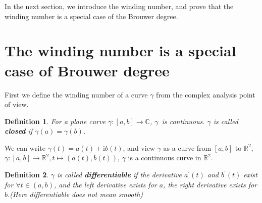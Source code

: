 \documentclass[11pt]{article}
\newtheorem{definition}{Definition}
\numberwithin{equation}{section} \numberwithin{theorem}{section}
\numberwithin{lemma}{section} \numberwithin{remark}{section}
\numberwithin{table}{section} \numberwithin{corollary}{section}
\numberwithin{example}{section} \numberwithin{conjecture}{section}
\numberwithin{assumption}{section}
\numberwithin{definition}{section}
\numberwithin{proposition}{section}
\begin{document}
 In the next section, we introduce the winding number, and  prove that the winding number is a special case of the Brouwer degree.

\section{The winding number is a special case of Brouwer degree}
First we define the winding number of a curve $\gamma$ from the complex analysis point of view.
\begin{definition}
For a plane curve $\gamma :[a,b]\rightarrow \mathbb{C}$,  $\gamma $\ is continuous. $ \gamma$ is called \textbf{closed }if $\gamma(a)=\gamma(b)$.
\end{definition}
We can write $\gamma(t) = a(t) +\mathrm{i}b(t)$, and view $\gamma$ as a curve from $[a,b]$ to $\mathbb{R}^2$, $\gamma:[a,b]\rightarrow \mathbb{R}^2,t \mapsto (a(t),b(t))$, $\gamma$ is a continuous curve in $\mathbb{R}^2$.  
\begin{definition}
$\gamma$ is called \textbf{differentiable} if the derivative $a^{'} (t)$ and  $b^{'} (t)$  exist for $\forall t \in (a,b)$, and the left derivative exists for $a$, the right derivative exists for $b$.(Here differentiable does not mean smooth)
\end{definition}
\end{document}
